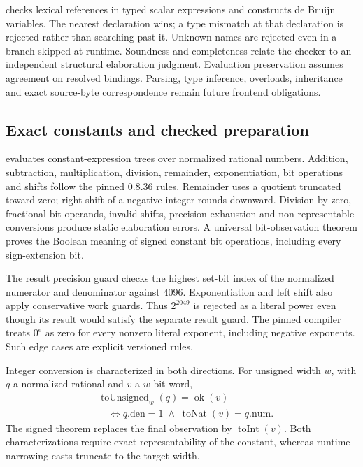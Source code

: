 \documentclass[conference]{IEEEtran}
\begin{document}
 checks lexical references in typed scalar
expressions and constructs de Bruijn variables. The nearest declaration wins;
a type mismatch at that declaration is rejected rather than searching past it.
Unknown names are rejected even in a branch skipped at runtime. Soundness and
completeness relate the checker to an independent structural elaboration
judgment. Evaluation preservation assumes agreement on resolved bindings.
Parsing, type inference, overloads, inheritance and exact source-byte
correspondence remain future frontend obligations.

\subsection{Exact constants and checked preparation}
 evaluates constant-expression trees over
normalized rational numbers. Addition, subtraction, multiplication, division,
remainder, exponentiation, bit operations and shifts follow the pinned 0.8.36
rules. Remainder uses a quotient truncated toward zero; right shift of a
negative integer rounds downward. Division by zero, fractional bit operands,
invalid shifts, precision exhaustion and non-representable conversions produce
static elaboration errors. A universal bit-observation theorem
proves the Boolean meaning of signed constant bit operations, including every
sign-extension bit.

The result precision guard checks the highest set-bit index of the normalized
numerator and denominator against 4096. Exponentiation and left shift also
apply conservative work guards. Thus $2^{2049}$ is rejected as a literal power
even though its result would satisfy the separate result guard. The pinned
compiler treats $0^e$ as zero for every nonzero literal exponent, including
negative exponents. Such edge cases are explicit versioned rules.

Integer conversion is characterized in both directions. For unsigned width
$w$, with $q$ a normalized rational and $v$ a $w$-bit word,
\[
 \begin{aligned}
 &\operatorname{toUnsigned}_w(q)=\operatorname{ok}(v)\\
 &\quad\iff q.\mathrm{den}=1\;\land\;\operatorname{toNat}(v)=q.\mathrm{num}.
 \end{aligned}
\]
The signed theorem replaces the final observation by
$\operatorname{toInt}(v)$. Both characterizations require exact representability
of the constant, whereas runtime narrowing casts truncate to the target width.
\end{document}
